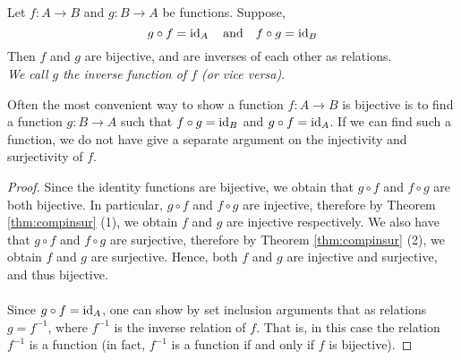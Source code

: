 \begin{theorem}
Let $f:A \to B$ and $g:B \to A$ be functions. Suppose,
\[g\circ f = \operatorname{id}_A \quad \text{and} \quad f\circ g = \operatorname{id}_B\]
Then $f$ and $g$ are bijective, and are inverses of each other as relations.\\[0.5em]
\emph{We call $g$ the \emph{inverse function} of $f$ (or vice versa)}.
\end{theorem}
\begin{remark}
Often the most convenient way to show a function $f:A \to B$ is bijective is to find a function $g:B \to A$ such that $f\circ g = \operatorname{id}_B$ and $g\circ f = \operatorname{id}_A$. If we can find such a function, we do not have give a separate argument on the injectivity and surjectivity of $f$. 
\end{remark}
\begin{proof}
Since the identity functions are bijective, we obtain that $g\circ f$ and $f\circ g$ are both bijective. In particular, $g\circ f$ and $f \circ g$ are injective, therefore by Theorem \ref{thm:compinsur} (1), we obtain $f$ and $g$ are injective respectively. We also have that $g\circ f$ and $f \circ g$ are surjective, therefore by Theorem \ref{thm:compinsur} (2), we obtain $f$ and $g$ are surjective. Hence, both $f$ and $g$ are injective and surjective, and thus bijective.\\
\\
Since $g\circ f = \operatorname{id}_A$, one can show by set inclusion arguments that as relations $g = f^{-1}$, where $f^{-1}$ is the inverse relation of $f$. That is, in this case the relation $f^{-1}$ is a function (in fact, $f^{-1}$ is a function if and only if $f$ is bijective).
\end{proof}

\vspace*{1em}

